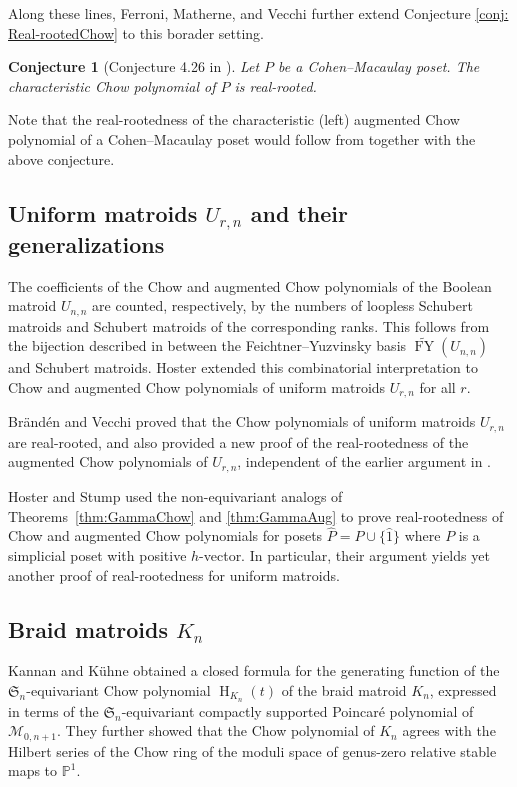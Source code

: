 \documentclass[reqno]{amsart}
\newtheorem{conj}[thm]{Conjecture}
\theoremstyle{definition}
\theoremstyle{remark}
\begin{document}
Along these lines, Ferroni, Matherne, and Vecchi further extend Conjecture \ref{conj: Real-rootedChow} to this borader setting. 
\begin{conj}[Conjecture 4.26 in \cite{FMVChowPoly}]
Let $P$ be a Cohen--Macaulay poset. The characteristic Chow polynomial of $P$ is real-rooted.    
\end{conj}
Note that the real-rootedness of the characteristic (left) augmented Chow polynomial of a Cohen--Macaulay poset would follow from \cite[Corollary~4.6]{FMVChowPoly} together with the above conjecture.

\subsection{Uniform matroids $U_{r,n}$ and their generalizations}
The coefficients of the Chow and augmented Chow polynomials of the Boolean matroid $U_{n,n}$ are counted, respectively, by the numbers of loopless Schubert matroids and Schubert matroids of the corresponding ranks. This follows from the bijection described in \cite[proof of Theorem~7.7]{EHL2022stellahedral} between the Feichtner--Yuzvinsky basis $\widetilde{\operatorname{FY}}(U_{n,n})$ and Schubert matroids.
Hoster \cite{HosterUniform2026} extended this combinatorial interpretation to Chow and augmented Chow polynomials of uniform matroids $U_{r,n}$ for all $r$.

Br\"{a}nd\'{e}n and Vecchi \cite{branden2025chow} proved that the Chow polynomials of uniform matroids $U_{r,n}$ are real-rooted, and also provided a new proof of the real-rootedness of the augmented Chow polynomials of $U_{r,n}$, independent of the earlier argument in \cite[Theorem~1.10]{Ferroni2024hilbert}.

Hoster and Stump \cite{HosterStumpRealrootedness2025} used the non-equivariant analogs of Theorems~\ref{thm:GammaChow} and \ref{thm:GammaAug} to prove real-rootedness of Chow and augmented Chow polynomials for posets $\widehat{P}=P\cup\{\hat{1}\}$ where $P$ is a simplicial poset with positive $h$-vector. In particular, their argument yields yet another proof of real-rootedness for uniform matroids.


\subsection{Braid matroids $K_n$}
Kannan and K\"{u}hne \cite{KannanBraid2025} obtained a closed formula for the generating function of the $\mathfrak{S}_n$-equivariant Chow polynomial $\operatorname{H}_{K_n}(t)$ of the braid matroid $K_n$, expressed in terms of the $\mathfrak{S}_n$-equivariant compactly supported Poincar\'e polynomial of $\mathcal{M}_{0,n+1}$. They further showed that the Chow polynomial of $K_n$ agrees with the Hilbert series of the Chow ring of the moduli space of genus-zero relative stable maps to $\mathbb{P}^1$.
\end{document}
